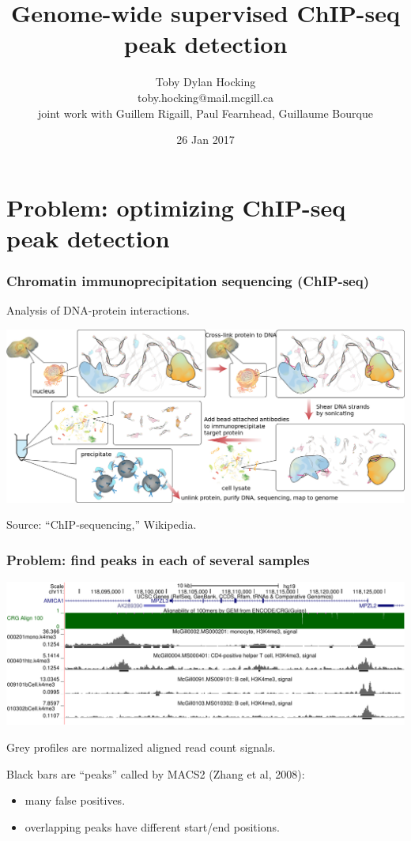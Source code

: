 \documentclass{beamer}
\begin{document}
\title{Genome-wide supervised ChIP-seq peak detection}

\author{
  Toby Dylan Hocking\\
  toby.hocking@mail.mcgill.ca\\
  joint work with Guillem Rigaill, Paul Fearnhead, 
  Guillaume Bourque}


\date{26 Jan 2017}

\maketitle

\section{Problem: optimizing ChIP-seq peak detection}

\begin{frame}
  \frametitle{Chromatin immunoprecipitation sequencing (ChIP-seq)}
  Analysis of DNA-protein interactions.

  \includegraphics[width=\textwidth]{Chromatin_immunoprecipitation_sequencing_wide.png}

  Source: ``ChIP-sequencing,'' Wikipedia.
\end{frame}

\begin{frame}
  \frametitle{Problem: find peaks in each of several samples}
  \includegraphics[width=\textwidth]{screenshot-ucsc-edited}

  Grey profiles are normalized aligned read count signals.

  Black bars are ``peaks'' called by MACS2 (Zhang et al, 2008):
  \begin{itemize}
  \item \alert<1>{many false positives}.
  \item overlapping peaks have different start/end positions.
  \end{itemize}
\end{frame}
\end{document}
